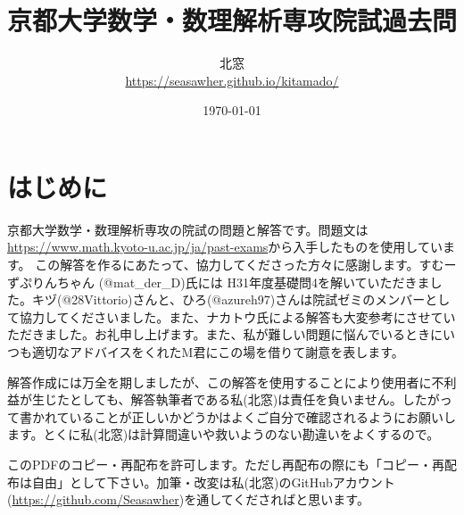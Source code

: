 \documentclass[10pt]{jsarticle}%
\begin{document}
\title{京都大学数学・数理解析専攻院試過去問}
\author{北窓 \\ \url{https://seasawher.github.io/kitamado/} }
\date{\today}
\maketitle




\tableofcontents%
\newpage



\section{はじめに}

京都大学数学・数理解析専攻の院試の問題と解答です。問題文は\url{https://www.math.kyoto-u.ac.jp/ja/past-exams}から入手したものを使用しています。
この解答を作るにあたって、協力してくださった方々に感謝します。すむーずぷりんちゃん (@mat\_der\_D)氏には H31年度基礎問4を解いていただきました。キヅ(@28Vittorio)さんと、ひろ(@azureh97)さんは院試ゼミのメンバーとして協力してくださいました。また、ナカトウ氏による解答も大変参考にさせていただきました。お礼申し上げます。また、私が難しい問題に悩んでいるときにいつも適切なアドバイスをくれたM君にこの場を借りて謝意を表します。

解答作成には万全を期しましたが、この解答を使用することにより使用者に不利益が生じたとしても、解答執筆者である私(北窓)は責任を負いません。したがって書かれていることが正しいかどうかはよくご自分で確認されるようにお願いします。とくに私(北窓)は計算間違いや救いようのない勘違いをよくするので。

このPDFのコピー・再配布を許可します。ただし再配布の際にも「コピー・再配布は自由」として下さい。加筆・改変は私(北窓)のGitHubアカウント(\url{https://github.com/Seasawher})を通してくださればと思います。


\newpage





\newpage



\newpage



\newpage



\newpage



\newpage


\end{document}
